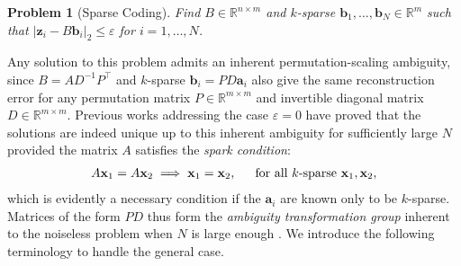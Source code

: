 \documentclass[journal, twocolumn]{IEEEtran}
\newtheorem{problem}{Problem}
\begin{document}
\begin{problem}[Sparse Coding]\label{InverseProblem}
Find $B \in \mathbb{R}^{n \times m}$ and $k$-sparse $\mathbf{b}_1, \ldots, \mathbf{b}_N \in \mathbb{R}^m$ such that $|\mathbf{z}_i - B\mathbf{b}_i|_2 \leq \varepsilon$ for $i = 1, \ldots, N$.
\end{problem}

Any solution to this problem admits an inherent permutation-scaling ambiguity, since $B = AD^{-1}P^{\top}$ and $k$-sparse $\mathbf{b}_i = PD\mathbf{a}_i$ also give the same reconstruction error for any permutation matrix $P \in \mathbb{R}^{m \times m}$ and invertible diagonal matrix $D \in \mathbb{R}^{m \times m}$. Previous works \cite{li2004analysis, Georgiev05, Aharon06, Hillar15}  addressing the case $\varepsilon = 0$ have proved that the solutions are indeed unique up to this inherent ambiguity for sufficiently large $N$ provided the matrix $A$ satisfies the \textit{spark condition}:
\begin{align}\label{SparkCondition}
A\mathbf{x}_1 = A\mathbf{x}_2 \implies \mathbf{x}_1 = \mathbf{x}_2,\indent \text{for all $k$-sparse } \mathbf{x}_1, \mathbf{x}_2,
\end{align}
%
which is evidently a necessary condition if the $\mathbf{a}_i$ are known only to be $k$-sparse. Matrices of the form $PD$ thus form the \emph{ambiguity transformation group} inherent to the noiseless problem when $N$ is large enough \cite{Li15}. We introduce the following terminology to handle the general case.


\end{document}
